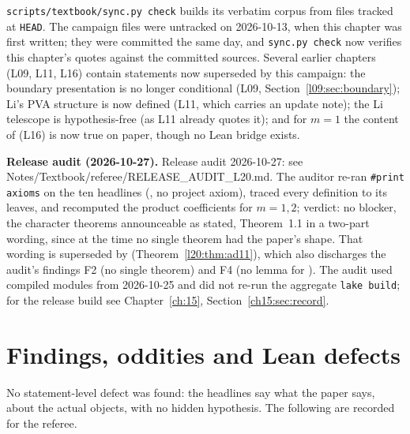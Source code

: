 \begin{warning}[title={Book tooling caveat (historical) and superseded statements elsewhere}]
\texttt{scripts/textbook/sync.py check} builds its verbatim corpus from files tracked at \texttt{HEAD}. The campaign
files were untracked on 2026-10-13, when this chapter was first written; they were committed the same day, and \texttt{sync.py check} now verifies this chapter's quotes against the committed sources. Several earlier chapters (L09, L11, L16) contain statements now superseded by this campaign: the boundary
presentation is no longer conditional (L09, Section~\ref{l09:sec:boundary}); Li's PVA structure is now defined (L11,
which carries an update note); the
Li telescope  is hypothesis-free (as L11 already quotes it); and for $m=1$
the content of  (L16) is now true on paper, though no Lean bridge exists.
\end{warning}

\textbf{Release audit (2026-10-27).} Release audit 2026-10-27: see Notes/Textbook/referee/RELEASE\_AUDIT\_L20.md. The
auditor re-ran \texttt{\#print axioms} on the ten headlines (, no project
axiom), traced every definition to its leaves, and recomputed the product coefficients for $m=1,2$; verdict: no blocker,
the character theorems announceable as stated, Theorem~1.1 in a two-part wording, since at the time no single
theorem had the paper's shape. That wording is superseded by  (Theorem~\ref{l20:thm:ad11}),
which also discharges the audit's findings F2 (no single theorem) and F4 (no  lemma for ). The audit used compiled modules from 2026-10-25 and did not re-run the aggregate
\texttt{lake build}; for the release build see Chapter~\ref{ch:15}, Section~\ref{ch15:sec:record}.

\section{Findings, oddities and Lean defects}\label{l20:sec:defects}

No statement-level defect was found: the headlines say what the paper says, about the actual objects, with no hidden
hypothesis. The following are recorded for the referee.

